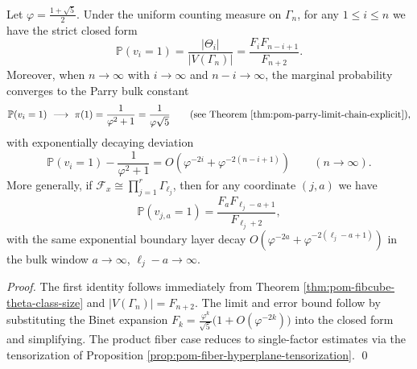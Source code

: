\begin{corollary}\label{cor:pom-fibcube-marginal-boundary-layer}
Let \(\varphi=\frac{1+\sqrt5}{2}\).
Under the uniform counting measure on \(\Gamma_n\), for any \(1\le i\le n\) we have the strict closed form
\[
\mathbb P(v_i=1)=\frac{|\Theta_i|}{|V(\Gamma_n)|}
=\frac{F_iF_{n-i+1}}{F_{n+2}}.
\]
Moreover, when \(n\to\infty\) with \(i\to\infty\) and \(n-i\to\infty\), the marginal probability converges to the Parry bulk constant
\[
\mathbb P(v_i=1)\ \longrightarrow\ \pi(1)=\frac{1}{\varphi^2+1}=\frac{1}{\varphi\sqrt5}
\qquad\text{(see Theorem \ref{thm:pom-parry-limit-chain-explicit})},
\]
with exponentially decaying deviation
\[
\mathbb P(v_i=1)-\frac{1}{\varphi^2+1}
=O\!\left(\varphi^{-2i}+\varphi^{-2(n-i+1)}\right)
\qquad(n\to\infty).
\]
More generally, if \(\mathcal F_x\cong\prod_{j=1}^r\Gamma_{\ell_j}\), then for any coordinate \((j,a)\) we have
\[
\mathbb P(v_{j,a}=1)=\frac{F_aF_{\ell_j-a+1}}{F_{\ell_j+2}},
\]
with the same exponential boundary layer decay
\(
O(\varphi^{-2a}+\varphi^{-2(\ell_j-a+1)})
\)
in the bulk window \(a\to\infty\), \(\ell_j-a\to\infty\).
\end{corollary}
\begin{proof}
The first identity follows immediately from Theorem \ref{thm:pom-fibcube-theta-class-size} and \(|V(\Gamma_n)|=F_{n+2}\).
The limit and error bound follow by substituting the Binet expansion
\(
F_k=\frac{\varphi^k}{\sqrt5}\bigl(1+O(\varphi^{-2k})\bigr)
\)
into the closed form and simplifying.
The product fiber case reduces to single-factor estimates via the tensorization of Proposition \ref{prop:pom-fiber-hyperplane-tensorization}. \qed
\end{proof}

